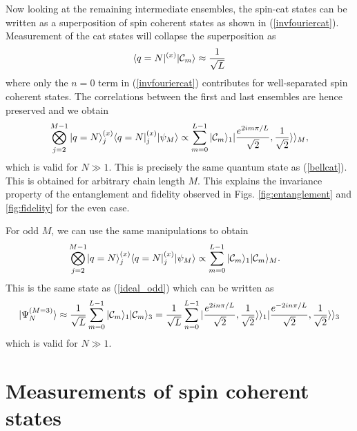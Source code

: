 \documentclass{WileyMSP-template}
\begin{document}
Now looking at the remaining intermediate ensembles, the spin-cat states can be written as a superposition of spin coherent states as shown in (\ref{invfouriercat}).  Measurement of the cat states will collapse the superposition as
%
\begin{align}
\langle q = N |^{(x)}  | {\cal C}_{m}  \rangle \approx \frac{1}{\sqrt{L}}
\end{align}
%
where only the $ n = 0 $ term in (\ref{invfouriercat}) contributes for well-separated spin coherent states.  The correlations between the first and last ensembles are hence preserved and we obtain
%
\begin{equation}
 \bigotimes_{j=2}^{M-1}  |q= N \rangle_j^{(x)} \langle q = N |_j^{(x)}  | \psi_M \rangle \propto   \sum_{m=0}^{L-1} | {\cal C}_{m}  \rangle_1 |\frac{e^{2 i m \pi/L }}{\sqrt{2}},\frac{1}{\sqrt{2}}\rangle\rangle_{M}  ,
\label{projideal}
\end{equation}
%
which is valid for $ N \gg 1 $.
This is precisely the same quantum state as (\ref{bellcat}).  This is obtained for arbitrary chain length $ M $.   This explains the invariance property of the entanglement and fidelity observed in Figs. \ref{fig:entanglement} and \ref{fig:fidelity} for the even case.

For odd $ M $, we can use the same manipulations to obtain
%
\begin{align}
 \bigotimes_{j=2}^{M-1} & |q= N \rangle_j^{(x)} \langle q = N |_j^{(x)}  | \psi_M \rangle \propto  \sum_{m=0}^{L-1} | {\cal C}_{m}  \rangle_1 | {\cal C}_{m}  \rangle_{M} .
\label{projideal}
\end{align}
%
This is the same state as (\ref{ideal_odd}) which can be written as
%
\begin{equation}
| \Psi_N^{(M=3)}  \rangle  \approx  \frac{1}{\sqrt{L}} \sum_{m=0}^{L-1} | {\cal C}_{m}  \rangle_1 | {\cal C}_{m}  \rangle_{3}
=  \frac{1}{\sqrt{L}} \sum_{n=0}^{L-1} |\frac{e^{2 i n \pi/L }}{\sqrt{2}},\frac{1}{\sqrt{2}}\rangle\rangle_{1} |\frac{e^{-2 i n \pi/L }}{\sqrt{2}},\frac{1}{\sqrt{2}}\rangle\rangle_{3}
\end{equation}
%
which is valid for $ N \gg 1 $.








\section{Measurements of spin coherent states}
\end{document}
